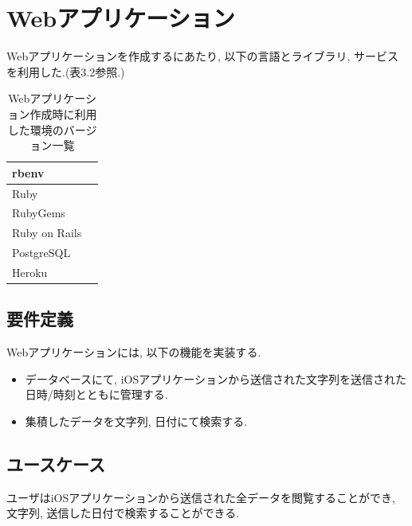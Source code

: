 \section{Webアプリケーション}
Webアプリケーションを作成するにあたり, 以下の言語とライブラリ, サービスを利用した.(表3.2参照.)

\begin{table}
\begin{center}
\begin{tabular}{|l|l|} \hline
rbenv & \\ \hline
Ruby & \\ \hline
RubyGems & \\ \hline
Ruby on Rails & \\ \hline
PostgreSQL & \\ \hline
Heroku & \\ \hline
\end{tabular}
\end{center}
\caption{Webアプリケーション作成時に利用した環境のバージョン一覧}
\end{table}

\subsection{要件定義}
Webアプリケーションには, 以下の機能を実装する.

\begin{itemize}
\item データベースにて, iOSアプリケーションから送信された文字列を送信された日時/時刻とともに管理する.

\item 集積したデータを文字列, 日付にて検索する.
\end{itemize}

\subsection{ユースケース}
ユーザはiOSアプリケーションから送信された全データを閲覧することができ, 文字列, 送信した日付で検索することができる.

